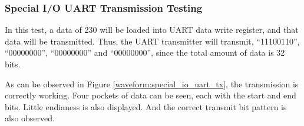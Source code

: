 \subsubsection{Special I/O UART Transmission Testing}
In this test, a data of 230 will be loaded into UART data write register, and that data will be transmitted.
Thus, the UART transmitter will transmit, ``11100110'', ``00000000'', ``00000000'' and ``00000000'', since the total amount of data is 32 bits.

As can be observed in Figure \ref{waveform:special_io_uart_tx}, the transmission is correctly working.
Four pockets of data can be seen, each with the start and end bits. Little endianess is also displayed.
And the correct transmit bit pattern is also observed.